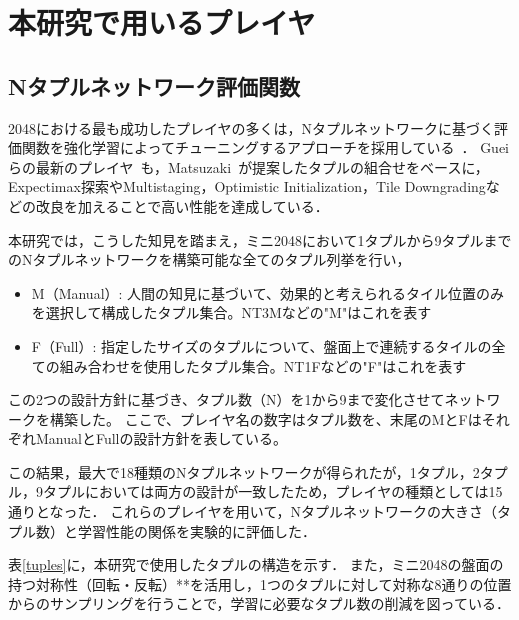 \section{本研究で用いるプレイヤ}
\subsection{Nタプルネットワーク評価関数}
\label{sec:Ntuple}

2048における最も成功したプレイヤの多くは，Nタプルネットワークに基づく評価関数を強化学習によってチューニングするアプローチを採用している~\cite{SzJa14}．
Gueiらの最新のプレイヤ~\cite{GuCW22}も，Matsuzaki~\cite{Mats16}が提案したタプルの組合せをベースに，Expectimax探索やMultistaging\cite{YWHC16}，Optimistic Initialization，Tile Downgrading\cite{GuCW22}などの改良を加えることで高い性能を達成している．

本研究では，こうした知見を踏まえ，ミニ2048において1タプルから9タプルまでのNタプルネットワークを構築可能な全てのタプル列挙を行い，
\begin{itemize}
  \item M（Manual）: 人間の知見に基づいて、効果的と考えられるタイル位置のみを選択して構成したタプル集合。NT3Mなどの"M"はこれを表す
  \item F（Full）: 指定したサイズのタプルについて、盤面上で連続するタイルの全ての組み合わせを使用したタプル集合。NT1Fなどの"F"はこれを表す
\end{itemize}

この2つの設計方針に基づき、タプル数（N）を1から9まで変化させてネットワークを構築した。
ここで、プレイヤ名の数字はタプル数を、末尾のMとFはそれぞれManualとFullの設計方針を表している。

この結果，最大で18種類のNタプルネットワークが得られたが，1タプル，2タプル，9タプルにおいては両方の設計が一致したため，プレイヤの種類としては15通りとなった．
これらのプレイヤを用いて，Nタプルネットワークの大きさ（タプル数）と学習性能の関係を実験的に評価した．

表\ref{tuples}に，本研究で使用したタプルの構造を示す．
また，ミニ2048の盤面の持つ対称性（回転・反転）**を活用し，1つのタプルに対して対称な8通りの位置からのサンプリングを行うことで，学習に必要なタプル数の削減を図っている．

